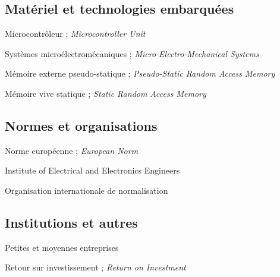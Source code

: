 \documentclass[oneside, french, a4paper, 12pt, reqno]{book}
\renewcommand\bibname{Bibliographie}
\begin{document}
\begin{description}[leftmargin=3.5cm, labelwidth=3cm, labelsep=0.5cm, style=nextline]
\subsection*{Matériel et technologies embarquées}
\item[MCU] Microcontrôleur ; \textit{Microcontroller Unit}
\item[MEMS] Systèmes microélectromécaniques ; \textit{Micro-Electro-Mechanical Systems}
\item[PSRAM] Mémoire externe pseudo-statique ; \textit{Pseudo-Static Random Access Memory}
\item[SRAM] Mémoire vive statique ; \textit{Static Random Access Memory}

\subsection*{Normes et organisations}
\item[EN] Norme européenne ; \textit{European Norm}
\item[IEEE] Institute of Electrical and Electronics Engineers
\item[ISO] Organisation internationale de normalisation

\subsection*{Institutions et autres}
\item[PME] Petites et moyennes entreprises
\item[ROI] Retour sur investissement ; \textit{Return on Investment}

\end{description}

\cleardoublepage
\mainmatter  %
\setcounter{page}{1}    %





\cleardoublepage
\renewcommand{\bibname}{Bibliographie}


\end{document}
